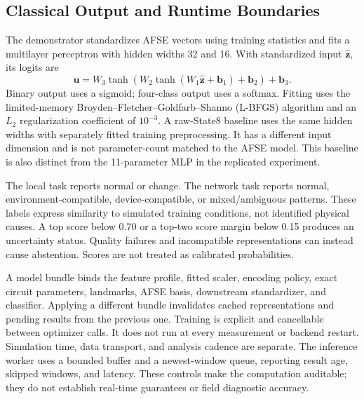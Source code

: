 \subsection{Classical Output and Runtime Boundaries}
\label{sec:framework-runtime}

The demonstrator standardizes AFSE vectors using training statistics and fits a multilayer perceptron with hidden widths 32 and 16. With standardized input $\widehat{\mathbf z}$, its logits are
\begin{equation}
 \mathbf u=W_3\tanh\!\left(W_2\tanh(W_1\widehat{\mathbf z}+\mathbf b_1)
                  +\mathbf b_2\right)+\mathbf b_3.
 \label{eq:mlp-logits}
\end{equation}
Binary output uses a sigmoid; four-class output uses a softmax. Fitting uses the limited-memory Broyden--Fletcher--Goldfarb--Shanno (L-BFGS) algorithm and an $L_2$ regularization coefficient of $10^{-3}$. A raw-State8 baseline uses the same hidden widths with separately fitted training preprocessing. It has a different input dimension and is not parameter-count matched to the AFSE model. This baseline is also distinct from the 11-parameter MLP in the replicated experiment.

The local task reports normal or change. The network task reports normal, environment-compatible, device-compatible, or mixed/ambiguous patterns. These labels express similarity to simulated training conditions, not identified physical causes. A top score below 0.70 or a top-two score margin below 0.15 produces an uncertainty status. Quality failures and incompatible representations can instead cause abstention. Scores are not treated as calibrated probabilities.

A model bundle binds the feature profile, fitted scaler, encoding policy, exact circuit parameters, landmarks, AFSE basis, downstream standardizer, and classifier. Applying a different bundle invalidates cached representations and pending results from the previous one. Training is explicit and cancellable between optimizer calls. It does not run at every measurement or backend restart. Simulation time, data transport, and analysis cadence are separate. The inference worker uses a bounded buffer and a newest-window queue, reporting result age, skipped windows, and latency. These controls make the computation auditable; they do not establish real-time guarantees or field diagnostic accuracy.
